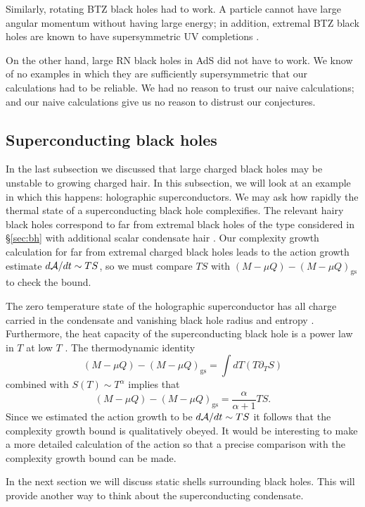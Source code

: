 \documentclass[12pt]{article}
\numberwithin{equation}{section}
\newcommand{\beq}{\begin{equation}}
\newcommand{\eeq}{\end{equation}}
\def\CA{{\cal A}}
\begin{document}
Similarly, rotating BTZ black holes had to work. A particle cannot have large angular momentum without having large energy; in addition, extremal BTZ black holes are known to have supersymmetric UV completions \cite{Coussaert:1993jp}.


On the other hand, large RN black holes in AdS did not have to work. We know of no examples in which they are sufficiently supersymmetric that our calculations had to be reliable. We had no reason to trust our naive calculations; and our naive calculations give us no reason to distrust our conjectures.





\subsection{Superconducting black holes}

In the last subsection we discussed that large charged black holes may be unstable to growing charged hair. In this subsection, we will look at an example in which this happens: holographic superconductors. We may ask how rapidly the thermal state of a superconducting black hole complexifies. The relevant hairy black holes correspond to far from extremal black holes of the type considered in \S\ref{sec:bh} with additional scalar condensate hair \cite{holosc1}. Our complexity growth calculation for far from extremal charged black holes leads to the action growth estimate $d\CA/dt \sim TS$, so we must compare $TS$ with  $(M - \mu Q) - (M - \mu Q)_{\text{gs}}$ to check the bound.

The zero temperature state of the holographic superconductor has all charge carried in the condensate and vanishing black hole radius and entropy \cite{holosc2}. Furthermore, the heat capacity of the superconducting black hole is a power law in $T$ at low $T$ \cite{holosc1}. The thermodynamic identity
\beq
(M - \mu Q) - (M - \mu Q)_{\text{gs}} = \int dT ( T \partial_T S)
\eeq
combined with $S(T) \sim T^\alpha$ implies that
\beq
(M - \mu Q) - (M - \mu Q)_{\text{gs}} = \frac{\alpha}{\alpha+1} TS.
\eeq
Since we estimated the action growth to be $d\CA/dt \sim TS$ it follows that the complexity growth bound is qualitatively obeyed. It would be interesting to make a more detailed calculation of the action so that a precise comparison with the complexity growth bound can be made.

In the next section we will discuss static shells surrounding black holes. This will provide another way to think about the superconducting condensate.
\end{document}
